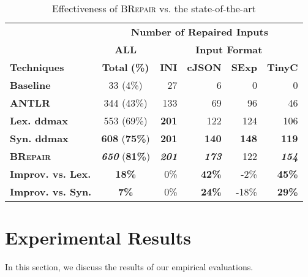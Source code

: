 \documentclass[sigconf,review,anonymous]{acmart}
\newcounter{todocounter}
\newcommand{\todo}[1]{\marginpar{$|$}\textcolor{red}{\stepcounter{todocounter}\footnote[\thetodocounter]{\textcolor{red}{\textbf{TODO }}\textit{#1}}}}
\renewcommand{\todo}[1]{}
\newcommand{\approach}{\textsc{BRepair}\xspace}
\begin{document}
\begin{table}[!tbp]\centering
\caption{Effectiveness of \approach vs. the state-of-the-art}
\begin{tabular}{|l | c | r  r  r  r |}
\hline
&  \multicolumn{5}{c|}{\textbf{Number of Repaired Inputs}}  \\
&  \multicolumn{1}{c|}{\textbf{ALL}} & \multicolumn{4}{c|}{\textbf{Input Format}}  \\
\textbf{Techniques} & \textbf{Total} \textbf{(\%)} & \textbf{INI} & \textbf{cJSON} & \textbf{SExp} & \textbf{TinyC} \\
\hline
\textbf{Baseline}   & 33 (4\%) & 27	 & 6 &	0	& 0\\
\textbf{ANTLR} & 344 (43\%) & 133 & 69 & 96 &  46   \\
\textbf{Lex. ddmax} & 553 (69\%) & \textbf{201}  & 122  & 124 & 106    \\ 			
\textbf{Syn. ddmax} & \textbf{608} (\textbf{75\%}) & \textbf{201}  & \textbf{140}  & \textbf{148}  & \textbf{119}  \\ 	
\hline 
\textbf{\approach}  & \textit{ \textbf{650}} (\textbf{81\%}) & \textit{ \textbf{201}} & \textit{ \textbf{173}}  & 122  & \textit{ \textbf{154}} \\
\hline
\textbf{Improv. vs. Lex.} &  \textbf{18\%}  & 0\% & \textbf{42\%} & -2\% & \textbf{45\%} \\ 
\textbf{Improv. vs. Syn.} &  \textbf{7\%}  & 0\% & \textbf{24\%} & -18\% & \textbf{29\%} \\
\hline
\end{tabular}
\label{tab:effectiveness}
\end{table}

\section{Experimental Results}

In this section, we 
discuss the %
results 
of our empirical evaluations. 

\todo{RQ1: we need to discuss the number of repair attempts or input fragments tested for feedback for \approach versus ddmax}
\end{document}
